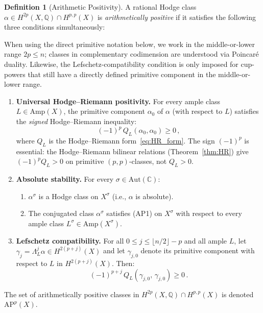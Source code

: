 \documentclass[aps,prd,twocolumn,superscriptaddress,nofootinbib]{revtex4-2}
\theoremstyle{definition}
\newtheorem{definition}[theorem]{Definition}
\theoremstyle{remark}
\begin{document}
\begin{definition}[Arithmetic Positivity]
\label{def:arith_pos}
A rational Hodge class $\alpha \in H^{2p}(X, \mathbb{Q}) \cap H^{p,p}(X)$ is \textit{arithmetically positive} if it satisfies the following three conditions simultaneously:

When using the direct primitive notation below, we work in the middle-or-lower range $2p\leq n$; classes in complementary codimension are understood via Poincaré duality.  Likewise, the Lefschetz-compatibility condition is only imposed for cup-powers that still have a directly defined primitive component in the middle-or-lower range.

\begin{enumerate}
\item[\textbf{(AP1)}] \textbf{Universal Hodge--Riemann positivity.} For every ample class $L \in \mathrm{Amp}(X)$, the primitive component $\alpha_0$ of $\alpha$ (with respect to $L$) satisfies the \textit{signed} Hodge--Riemann inequality:
\begin{equation}
(-1)^p\, Q_L(\alpha_0, \alpha_0) \geq 0\,,
\label{eq:AP1}
\end{equation}
where $Q_L$ is the Hodge--Riemann form~\eqref{eq:HR_form}. The sign $(-1)^p$ is essential: the Hodge--Riemann bilinear relations (Theorem~\ref{thm:HR}) give $(-1)^p Q_L > 0$ on primitive $(p,p)$-classes, not $Q_L > 0$.

\item[\textbf{(AP2)}] \textbf{Absolute stability.} For every $\sigma \in \mathrm{Aut}(\mathbb{C})$:
\begin{enumerate}
\item[(a)] $\alpha^\sigma$ is a Hodge class on $X^\sigma$ (i.e., $\alpha$ is absolute).
\item[(b)] The conjugated class $\alpha^\sigma$ satisfies (AP1) on $X^\sigma$ with respect to every ample class $L^\sigma \in \mathrm{Amp}(X^\sigma)$.
\end{enumerate}

\item[\textbf{(AP3)}] \textbf{Lefschetz compatibility.} For all $0 \leq j \leq \lfloor n/2\rfloor - p$ and all ample $L$, let $\gamma_j = \Lambda_L^j \alpha \in H^{2(p+j)}(X)$ and let $\gamma_{j,0}$ denote its primitive component with respect to $L$ in $H^{2(p+j)}(X)$. Then:
\begin{equation}
(-1)^{p+j}\, Q_{L}(\gamma_{j,0},\, \gamma_{j,0}) \geq 0\,.
\label{eq:AP3}
\end{equation}
\end{enumerate}

The set of arithmetically positive classes in $H^{2p}(X, \mathbb{Q}) \cap H^{p,p}(X)$ is denoted $\mathrm{AP}^p(X)$.
\end{definition}
\end{document}
